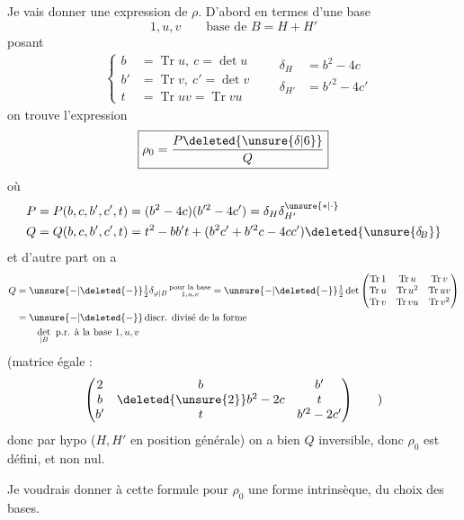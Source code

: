 Je vais donner une expression de $\rho$. D'abord en termes d'une base
\[
1,u,v\qquad\text{base de } B=H+H'
\]
posant
\[
\begin{aligned}
&\left\{\begin{aligned} b&=\operatorname{Tr}u,\ c=\det u\\ b'&=\operatorname{Tr}v,\ c'=\det v\\ t&=\operatorname{Tr}uv=\operatorname{Tr}vu
\end{aligned}\right. &&
\begin{aligned}\delta_H&=b^2-4c\\ \delta_{H'}&=b'^2-4c'\\ &\end{aligned}
\end{aligned}
\]
on trouve l'expression 
\[
\boxed{\rho_0=\frac{P\deleted{\unsure{\delta|6}}}{Q}}
\]
où
\[
\begin{aligned}
P&=P(b,c,b',c',t)=(b^2-4c)(b'^2-4c')=\delta_H\delta_{H'}^{\unsure{*|\cdot}}\\ Q&=Q(b,c,b',c',t)=t^2-bb't+(b^2c'+b'^2c-4cc')\deleted{\unsure{\delta_{\!B}}}
\end{aligned}
\]
et d'autre part on a
\[
\begin{aligned}
Q&=\unsure{-|{\deleted{-}}}\tfrac12\delta_{\varphi|B}\,\substack{\text{pour la base}\\1,u,v} =\unsure{-|{\deleted{-}}}\tfrac12\det\begin{pmatrix} \operatorname{Tr}1 & \operatorname{Tr}u & \operatorname{Tr}v\\ \operatorname{Tr}u & \operatorname{Tr}u^2 & \operatorname{Tr}uv\\ \operatorname{Tr}v & \operatorname{Tr}vu & \operatorname{Tr}v^2
\end{pmatrix}\\
&=\unsure{-|{\deleted{-}}}\,\text{discr. divisé de la forme}\\ &\qquad\det_{|B}\ \text{p.r. à la base }1,u,v
\end{aligned}
\]
(matrice  égale :
\[
\begin{pmatrix}2&b&b'\\ b&\deleted{\unsure{2}}b^2-2c&t\\ b'&t&b'^2-2c'\end{pmatrix}\qquad)
\]
donc par hypo ($H,H'$ en position générale)  on a bien $Q$ inversible, donc $\rho_0$ est défini, et non nul.

Je voudrais donner à cette formule pour $\rho_0$ une forme intrinsèque,  du choix des bases.
